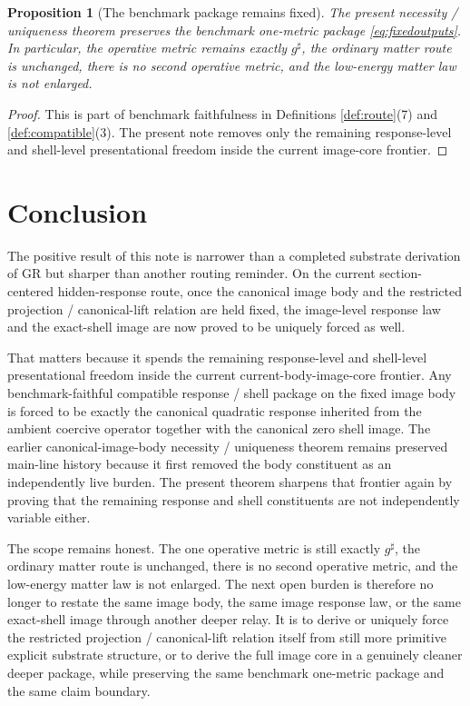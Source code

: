 \documentclass[11pt]{article}
\newcommand{\CompletedMetric}{g^{\sharp}}
\newtheorem{proposition}{Proposition}
\begin{document}
\begin{proposition}[The benchmark package remains fixed]
\label{prop:benchmark}
The present necessity / uniqueness theorem preserves the benchmark one-metric package \eqref{eq:fixedoutputs}. In particular, the operative metric remains exactly \(\CompletedMetric\), the ordinary matter route is unchanged, there is no second operative metric, and the low-energy matter law is not enlarged.
\end{proposition}

\begin{proof}
This is part of benchmark faithfulness in Definitions \ref{def:route}(7) and \ref{def:compatible}(3). The present note removes only the remaining response-level and shell-level presentational freedom inside the current image-core frontier.
\end{proof}

\section{Conclusion}

The positive result of this note is narrower than a completed substrate derivation of GR but sharper than another routing reminder. On the current section-centered hidden-response route, once the canonical image body and the restricted projection / canonical-lift relation are held fixed, the image-level response law and the exact-shell image are now proved to be uniquely forced as well.

That matters because it spends the remaining response-level and shell-level presentational freedom inside the current current-body-image-core frontier. Any benchmark-faithful compatible response / shell package on the fixed image body is forced to be exactly the canonical quadratic response inherited from the ambient coercive operator together with the canonical zero shell image. The earlier canonical-image-body necessity / uniqueness theorem remains preserved main-line history because it first removed the body constituent as an independently live burden. The present theorem sharpens that frontier again by proving that the remaining response and shell constituents are not independently variable either.

The scope remains honest. The one operative metric is still exactly \(\CompletedMetric\), the ordinary matter route is unchanged, there is no second operative metric, and the low-energy matter law is not enlarged. The next open burden is therefore no longer to restate the same image body, the same image response law, or the same exact-shell image through another deeper relay. It is to derive or uniquely force the restricted projection / canonical-lift relation itself from still more primitive explicit substrate structure, or to derive the full image core in a genuinely cleaner deeper package, while preserving the same benchmark one-metric package and the same claim boundary.
\end{document}
